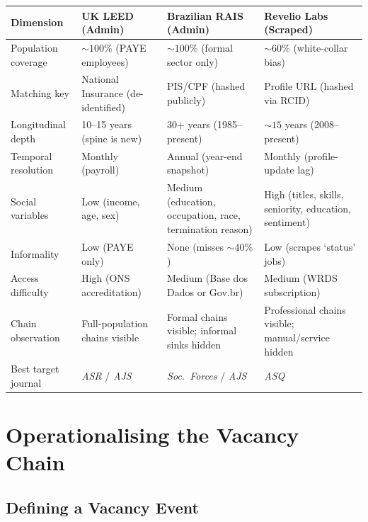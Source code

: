 \documentclass[a4paper]{tufte-handout}
\begin{document}
\begin{fullwidth}
\smallskip
\small
\begin{tabularx}{\linewidth}{@{}l X X X@{}}
  \toprule
  \textbf{Dimension} & \textbf{UK LEED (Admin)} & \textbf{Brazilian RAIS (Admin)} & \textbf{Revelio Labs (Scraped)} \\
  \midrule
  Population coverage  & ${\sim}100\%$ (PAYE employees)       & ${\sim}100\%$ (formal sector only)   & ${\sim}60\%$ (white-collar bias) \\[3pt]
  Matching key         & National Insurance (de-identified)   & PIS/CPF (hashed publicly)            & Profile URL (hashed via RCID) \\[3pt]
  Longitudinal depth   & 10--15 years (spine is new)          & 30+ years (1985--present)            & ${\sim}15$ years (2008--present) \\[3pt]
  Temporal resolution  & Monthly (payroll)                    & Annual (year-end snapshot)           & Monthly (profile-update lag) \\[3pt]
  Social variables     & Low (income, age, sex)               & Medium (education, occupation, race, termination reason) & High (titles, skills, seniority, education, sentiment) \\[3pt]
  Informality          & Low (PAYE only)                      & None (misses ${\sim}40\%$)           & Low (scrapes `status' jobs) \\[3pt]
  Access difficulty     & High (ONS accreditation)             & Medium (Base dos Dados or Gov.br)    & Medium (WRDS subscription) \\[3pt]
  Chain observation    & Full-population chains visible       & Formal chains visible; informal sinks hidden & Professional chains visible; manual/service hidden \\[3pt]
  Best target journal  & \emph{ASR} / \emph{AJS}              & \emph{Soc.\ Forces} / \emph{AJS}     & \emph{ASQ} \\
  \bottomrule
\end{tabularx}
\smallskip
\end{fullwidth}


\section{Operationalising the Vacancy Chain}

\subsection{Defining a Vacancy Event}
\end{document}
